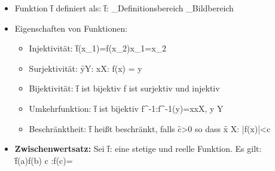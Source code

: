 \begin{itemize}
    \item Funktion \f{f} definiert als: \f{\quad f: _\textrm{Definitionsbereich} \to {}_\textrm{Bildbereich}}
    \item Eigenschaften von Funktionen:
    \begin{itemize}
        \item Injektivität: \f{f(x_1)=f(x_2)\Rightarrow x_1=x_2}
        \item Surjektivität: \f{\forall y\in Y: \exists x\in X: f(x) = y}
        \item Bijektivität: \f{f \textrm{ ist bijektiv} \Leftrightarrow f \textrm{ ist surjektiv und injektiv}}
        \item Umkehrfunktion: \f{f \textrm{ ist bijektiv} \Rightarrow \exists f^{-1}:f^{-1}(y)=x\quad \forall x\in X, \forall y \in Y}
        \item Beschränktheit: \f{f} heißt beschränkt, falls \f{\exists c>0} so dass \f{\forall x \in X: |f(x)|<c}
    \end{itemize}
    \item \textbf{Zwischenwertsatz:} Sei \f{f:\left[a,b\right]\to{}} eine stetige und reelle Funktion. Es gilt:\\
    \f{f(a)\leq\gamma \leq f(b) \Rightarrow \exists c \in \left[a,b\right]:f(c)=\gamma }
\end{itemize}


